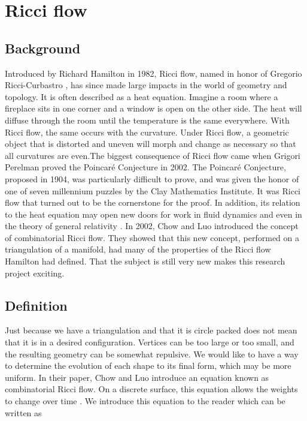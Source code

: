 \documentclass[12pt]{article}
\begin{document}
\section{Ricci flow}
\subsection{Background}
Introduced by Richard Hamilton in 1982, Ricci flow, named in honor of Gregorio Ricci-Curbastro \cite{RicciBkgd}, has since made large impacts in the world of geometry and topology. It is often described as a heat equation. Imagine a room where a fireplace sits in one corner and a window is open on the other side. The heat will diffuse through the room until the temperature is the same everywhere. With Ricci flow, the same occurs with the curvature. Under Ricci flow, a geometric object that is distorted and uneven will morph and change as necessary so that all curvatures are even.The biggest consequence of Ricci flow came when Grigori Perelman proved the Poincar\'{e} Conjecture in 2002. The Poincar\'{e} Conjecture, proposed in 1904, was particularly difficult to prove, and was given the honor of one of seven millennium puzzles by the Clay Mathematics Institute. It was Ricci flow that turned out to be the cornerstone for the proof. In addition, its relation to the heat equation may open new doors for work in fluid dynamics and even in the theory of general relativity \cite{RicciBkgd}. In 2002, Chow and Luo introduced the concept of combinatorial Ricci flow. They showed that this new concept, performed on a triangulation of a manifold, had many of the properties of the Ricci flow Hamilton had defined. That the subject is still very new makes this research project exciting.

\subsection{Definition}

Just because we have a triangulation and that it is circle packed does not mean that it is in a desired configuration. Vertices can be too large or too small, and the resulting geometry can be somewhat repulsive. We would like to have a way to determine the evolution of each shape to its final form, which may be more uniform. In their paper, Chow and Luo introduce an equation known as combinatorial Ricci flow. On a discrete surface, this equation allows the weights to change over time \cite{chowluo}. We introduce this equation to the reader which can be written as
\end{document}

